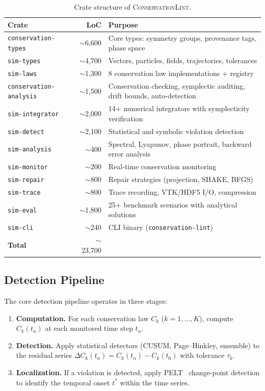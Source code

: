 \documentclass[11pt,a4paper]{article}
\begin{document}
\begin{table}[h]
\centering
\caption{Crate structure of \textsc{ConservationLint}.}
\label{tab:crates}
\begin{tabular}{lrp{7cm}}
\toprule
\textbf{Crate} & \textbf{LoC} & \textbf{Purpose} \\
\midrule
\texttt{conservation-types} & ${\sim}$6{,}600 & Core types: symmetry groups, provenance tags, phase space \\
\texttt{sim-types} & ${\sim}$4{,}700 & Vectors, particles, fields, trajectories, tolerances \\
\texttt{sim-laws} & ${\sim}$1{,}300 & 8 conservation law implementations + registry \\
\texttt{conservation-analysis} & ${\sim}$1{,}500 & Conservation checking, symplectic auditing, drift bounds, auto-detection \\
\texttt{sim-integrator} & ${\sim}$2{,}000 & 14+ numerical integrators with symplecticity verification \\
\texttt{sim-detect} & ${\sim}$2{,}100 & Statistical and symbolic violation detection \\
\texttt{sim-analysis} & ${\sim}$400 & Spectral, Lyapunov, phase portrait, backward error analysis \\
\texttt{sim-monitor} & ${\sim}$200 & Real-time conservation monitoring \\
\texttt{sim-repair} & ${\sim}$800 & Repair strategies (projection, SHAKE, BFGS) \\
\texttt{sim-trace} & ${\sim}$800 & Trace recording, VTK/HDF5 I/O, compression \\
\texttt{sim-eval} & ${\sim}$1{,}800 & 25+ benchmark scenarios with analytical solutions \\
\texttt{sim-cli} & ${\sim}$240 & CLI binary (\texttt{conservation-lint}) \\
\midrule
\textbf{Total} & ${\sim}$23{,}700 & \\
\bottomrule
\end{tabular}
\end{table}

\subsection{Detection Pipeline}

The core detection pipeline operates in three stages:

\begin{enumerate}
    \item \textbf{Computation.} For each conservation law $C_k$ ($k = 1, \ldots, K$), compute $C_k(t_n)$ at each monitored time step $t_n$.
    \item \textbf{Detection.} Apply statistical detectors (CUSUM, Page--Hinkley, ensemble) to the residual series $\Delta C_k(t_n) = C_k(t_n) - C_k(t_0)$ with tolerance $\tau_k$.
    \item \textbf{Localization.} If a violation is detected, apply PELT~\citep{killick2012} change-point detection to identify the temporal onset $t^*$ within the time series.
\end{enumerate}
\end{document}
